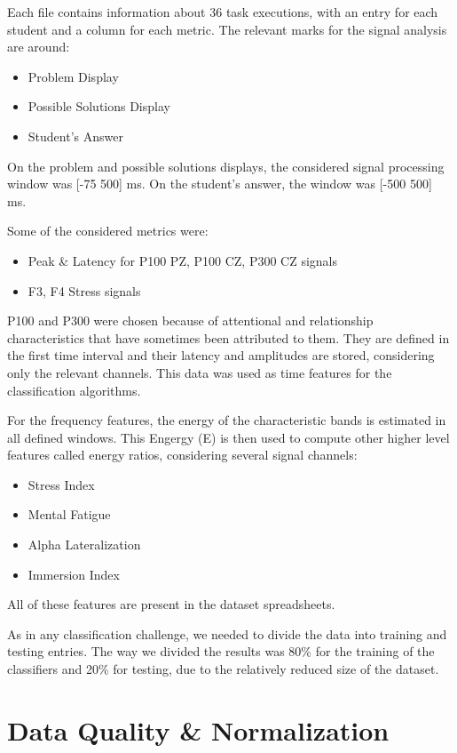 \documentclass[extendedabs]{recpad2k}
\begin{document}
Each file contains information about 36 task executions, with an entry for each student and a column for each metric. 
The relevant marks for the signal analysis are around: 
\begin{itemize}[noitemsep,nolistsep]
\item Problem Display
\item Possible Solutions Display
\item Student's Answer
\end{itemize}
\vspace{2pt}
On the problem and possible solutions displays, the considered signal processing window was [-75 500] ms.
On the student's answer, the window was [-500 500] ms.

Some of the considered metrics were:
\begin{itemize}[noitemsep,nolistsep]
\item Peak \& Latency for P100 PZ, P100 CZ, P300 CZ signals
\item F3, F4 Stress signals
\end{itemize}
\vspace{2pt}
P100 and P300 were chosen because of attentional and relationship characteristics that have sometimes been attributed to them.
They are defined in the first time interval and their latency and amplitudes are stored, considering only the relevant channels.
This data was used as time features for the classification algorithms.

For the frequency features, the energy of the characteristic bands is estimated in all defined windows.
This Engergy (E) is then used to compute other higher level features called energy ratios, considering several signal channels:
\begin{itemize}[noitemsep,nolistsep]
\item Stress Index
\item Mental Fatigue
\item Alpha Lateralization
\item Immersion Index
\end{itemize}
\vspace{2pt}
All of these features are present in the dataset spreadsheets.

As in any classification challenge, we needed to divide the data into training and testing entries.
The way we divided the results was 80\% for the training of the classifiers and 20\% for testing, due to the relatively reduced size of the dataset.

\section{Data Quality \& Normalization}\label{data} %
\end{document}
